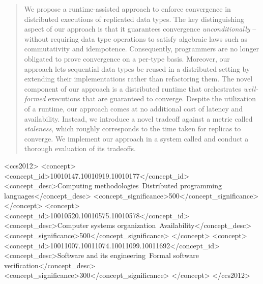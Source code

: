 \documentclass[sigplan,screen]{acmart}
\begin{document}
\author{Nicholas V. Lewchenko}
%

\begin{abstract}
  We propose a runtime-assisted approach to enforce convergence in
  distributed executions of replicated data types. The key
  distinguishing aspect of our approach is that it guarantees
  convergence \emph{unconditionally} -- without requiring data type
  operations to satisfy algebraic laws such as commutativity and
  idempotence. Consequently, programmers are no longer obligated to
  prove convergence on a per-type basis. Moreover, our approach lets
  sequential data types be reused in a distributed setting by
  extending their implementations rather than refactoring them.  The
  novel component of our approach is a distributed runtime that
  orchestrates \emph{well-formed } executions that are guaranteed to
  converge. Despite the utilization of a runtime, our approach comes
  at no additional cost of latency and availability. Instead, we
  introduce a novel tradeoff against a metric called \emph{staleness},
  which roughly corresponds to the time taken for replicas to
  converge. We implement our approach in a system called \quark and
  conduct a thorough evaluation of its tradeoffs. 
\end{abstract}


\begin{CCSXML}
<ccs2012>
<concept>
<concept_id>10010147.10010919.10010177</concept_id>
<concept_desc>Computing methodologies~Distributed programming languages</concept_desc>
<concept_significance>500</concept_significance>
</concept>
<concept>
<concept_id>10010520.10010575.10010578</concept_id>
<concept_desc>Computer systems organization~Availability</concept_desc>
<concept_significance>500</concept_significance>
</concept>
<concept>
<concept_id>10011007.10011074.10011099.10011692</concept_id>
<concept_desc>Software and its engineering~Formal software verification</concept_desc>
<concept_significance>300</concept_significance>
</concept>
</ccs2012>
\end{CCSXML}
\end{document}
